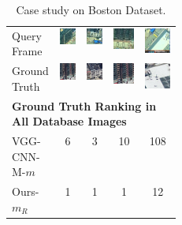 \begin{table}[htbp]
\begin{tabular}{p{0.25\linewidth}|c|c|c|c}
Query Frame & 
\includegraphics[width=0.15\linewidth]{img/case_1} &
\includegraphics[width=0.15\linewidth]{img/case_2} &
\includegraphics[width=0.15\linewidth]{img/case_3} &
\includegraphics[width=0.15\linewidth]{img/case_4} \\
Ground Truth & 
\includegraphics[width=0.15\linewidth]{img/case_1_grnd} &
\includegraphics[width=0.15\linewidth]{img/case_2_grnd} &
\includegraphics[width=0.15\linewidth]{img/case_3_grnd} &
\includegraphics[width=0.15\linewidth]{img/case_4_grnd} \\
\hline
\multicolumn{5}{l}{\textbf{Ground Truth Ranking in All Database Images}} \\
\hline
VGG-CNN-M-$m$ & 6 & 3 & 10 & 108\\
Ours-$m_R$ & 1 & 1 & 1 & 12\\
\end{tabular}
\caption{Case study on Boston Dataset.}
\label{table:bostoncase}
\end{table}


